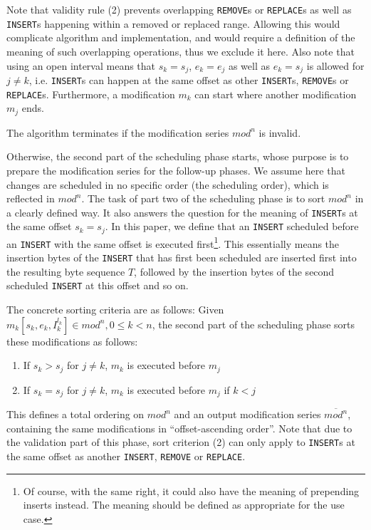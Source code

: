 \documentclass[english, 10pt, openright, twocolumn, landscape, twoside, notitlepage, a4paper, pdftex]		
{article}
\begin{document}
Note that validity rule (2) prevents overlapping \texttt{REMOVE}s or \texttt{REPLACE}s as well as \texttt{INSERT}s happening within a removed or replaced range. Allowing this would complicate algorithm and implementation, and would require a definition of the meaning of such overlapping operations, thus we exclude it here. Also note that using an open interval means that $s_{k}=s_{j}$, $e_{k}=e_{j}$ as well as $e_{k}=s_{j}$ is allowed for $j\neq k$, i.e. \texttt{INSERT}s can happen at the same offset as other \texttt{INSERT}s, \texttt{REMOVE}s or \texttt{REPLACE}s. Furthermore, a modification $m_{k}$ can start where another modification $m_{j}$ ends.

The algorithm terminates if the modification series $mod^{n}$ is invalid.

Otherwise, the second part of the scheduling phase starts, whose purpose is to prepare the modification series for the follow-up phases. We assume here that changes are scheduled in no specific order (the scheduling order), which is reflected in $mod^{n}$. The task of part two of the scheduling phase is to sort $mod^{n}$ in a clearly defined way. It also answers the question for the meaning of \texttt{INSERT}s at the same offset $s_{k}=s_{j}$. In this paper, we define that an \texttt{INSERT} scheduled before an \texttt{INSERT} with the same offset is executed first\footnote{Of course, with the same right, it could also have the meaning of prepending inserts instead. The meaning should be defined as appropriate for the use case.}. This essentially means the insertion bytes of the \texttt{INSERT} that has first been scheduled are inserted first into the resulting byte sequence $T$, followed by the insertion bytes of the second scheduled \texttt{INSERT} at this offset and so on.

The concrete sorting criteria are as follows: Given $m_{k}[s_{k},e_{k},I_{k}^{l_{k}}]\in mod^{n}, 0\leq k< n$, the second part of the scheduling phase sorts these modifications as follows:
\begin{enumerate}
\item If $s_{k}>s_{j}$ for $j\neq k$, $m_{k}$ is executed before $m_{j}$
\item If $s_{k}=s_{j}$ for $j\neq k$, $m_{k}$ is executed before $m_{j}$ if $k<j$
\end{enumerate}

This defines a total ordering on $mod^{n}$ and an output modification series $\overline{mod^{n}}$, containing the same modifications in ``offset-ascending order''. Note that due to the validation part of this phase, sort criterion (2) can only apply to \texttt{INSERT}s at the same offset as another \texttt{INSERT}, \texttt{REMOVE} or \texttt{REPLACE}.
\end{document}

